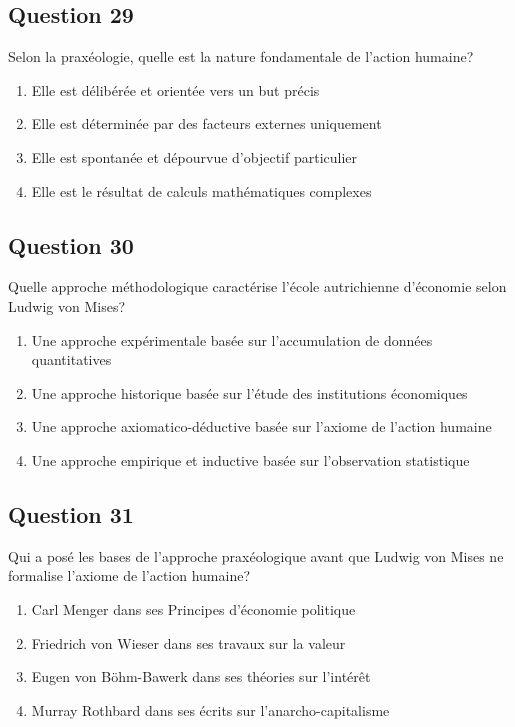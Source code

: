 \documentclass[12pt,a4paper]{article}
\begin{document}
\bigskip


\subsection*{Question 29}
Selon la praxéologie, quelle est la nature fondamentale de l'action humaine?

\begin{enumerate}[label=\Alph*., leftmargin=*]
\item Elle est délibérée et orientée vers un but précis
\item Elle est déterminée par des facteurs externes uniquement
\item Elle est spontanée et dépourvue d'objectif particulier
\item Elle est le résultat de calculs mathématiques complexes
\end{enumerate}

\bigskip


\subsection*{Question 30}
Quelle approche méthodologique caractérise l'école autrichienne d'économie selon Ludwig von Mises?

\begin{enumerate}[label=\Alph*., leftmargin=*]
\item Une approche expérimentale basée sur l'accumulation de données quantitatives
\item Une approche historique basée sur l'étude des institutions économiques
\item Une approche axiomatico-déductive basée sur l'axiome de l'action humaine
\item Une approche empirique et inductive basée sur l'observation statistique
\end{enumerate}

\bigskip


\subsection*{Question 31}
Qui a posé les bases de l'approche praxéologique avant que Ludwig von Mises ne formalise l'axiome de l'action humaine?

\begin{enumerate}[label=\Alph*., leftmargin=*]
\item Carl Menger dans ses Principes d'économie politique
\item Friedrich von Wieser dans ses travaux sur la valeur
\item Eugen von Böhm-Bawerk dans ses théories sur l'intérêt
\item Murray Rothbard dans ses écrits sur l'anarcho-capitalisme
\end{enumerate}
\end{document}
